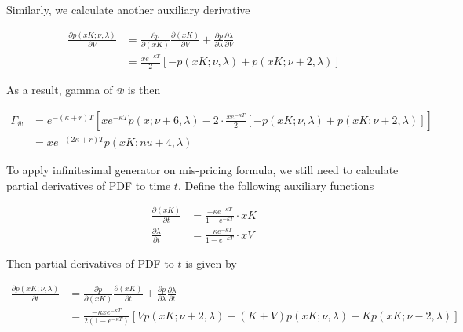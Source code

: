 \noindent Similarly, we calculate another auxiliary derivative

\begin{equation}
    \begin{aligned}
        \frac{\partial p(xK;\nu,\lambda)}{\partial V} &= \frac{\partial p}{\partial (xK)}\frac{\partial (xK)}{\partial V} + \frac{\partial p}{\partial \lambda} \frac{\partial \lambda}{\partial V} \\
        &= \frac{x e^{-\kappa T}}{2} [-p(xK ; \nu, \lambda)+p(xK ; \nu+2, \lambda)]
    \end{aligned}
\end{equation}

\noindent As a result, gamma of $\bar{w}$ is then

\begin{equation}\label{gamma}
    \begin{aligned}
        \Gamma_{\bar{w}}&= e^{ -(\kappa+r) T} \left[x e^{-\kappa T} p(x ; \nu+6, \lambda)-2 \cdot \frac{x e^{-\kappa T}}{2} [-p(xK ; \nu, \lambda)+p(xK ; \nu+2, \lambda)]\right] \\
        &= xe^{ -(2\kappa+r) T}p(xK;nu+4,\lambda)
    \end{aligned}
\end{equation}

To apply infinitesimal generator on mis-pricing formula, we still need to calculate partial derivatives of PDF to time $t$. Define the following auxiliary functions

\begin{equation}
    \begin{aligned}
        \frac{\partial (x K)}{\partial t}&= \frac{-\kappa e^{-\kappa T}}{1 - e^{-\kappa T}} \cdot  xK\\
        \frac{\partial \lambda}{\partial t}& =\frac{-\kappa e^{-\kappa T}}{1 - e^{-\kappa T}} \cdot  xV
    \end{aligned}
\end{equation}

\noindent Then partial derivatives of PDF to $t$ is given by

\begin{equation}
    \begin{aligned}
        \frac{\partial p(xK; \nu, \lambda)}{\partial t}&= \frac{\partial p}{\partial (xK)}\frac{\partial (xK)}{\partial t} + \frac{\partial p}{\partial \lambda} \frac{\partial \lambda}{\partial t} \\
        &= \frac{-\kappa x e^{-\kappa T}}{2(1 - e^{-\kappa T})} \left[Vp(xK ; \nu+2, \lambda) - (K+V) p(xK ; \nu, \lambda) + K p(xK ; \nu-2, \lambda)\right]\\
    \end{aligned}
\end{equation}

